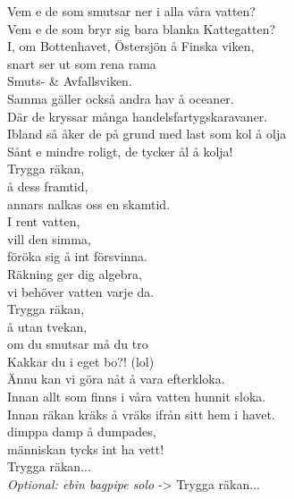 \documentclass[12pt]{article}
\begin{document}
\noindent
\begin{minipage}{0.5\textwidth}
	
	Vem e de som smutsar ner i alla våra vatten?\\
	Vem e de som bryr sig bara blanka Kattegatten?\\
	I, om Bottenhavet, Östersjön å Finska viken,\\
	snart ser ut som rena rama \\Smuts- \& Avfallsviken.\\
	
	
	Samma gäller också andra hav å oceaner.\\
	Där de kryssar många handelsfartygskaravaner.\\
	Ibland så åker de på grund med last som kol å olja\\
	Sånt e mindre roligt, de tycker ål å kolja!\\
	
	
	Trygga räkan,\\
	å dess framtid,\\
	annars nalkas oss en skamtid.\\
	I rent vatten,\\
	vill den simma,\\
	föröka sig å int försvinna.\\
	Räkning ger dig algebra,\\
	vi behöver vatten varje da.\\
	Trygga räkan,\\
	å utan tvekan,\\
	om du smutsar må du tro\\
	Kakkar du i eget bo?! (lol)\\
	
	
	Ännu kan vi göra nåt å vara efterkloka.\\
	Innan allt som finns i våra vatten hunnit sloka.\\
	Innan räkan kräks å vräks ifrån sitt hem i havet.\\
	dimppa damp å dumpades,\\
	människan tycks int ha vett!\\
	
	
	Trygga räkan...\\
	
	\noindent
	\textit{Optional: ebin bagpipe solo} -> Trygga räkan...
	
	\vspace{3cm}
\end{minipage}%
\hspace{0.1\textwidth}
\end{document}
